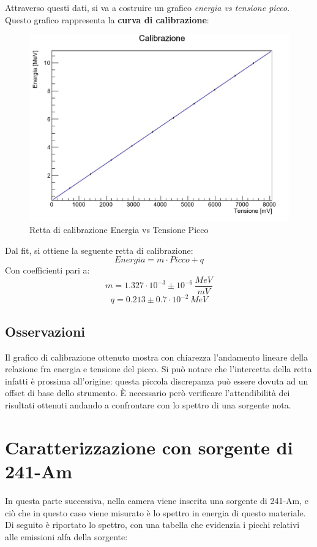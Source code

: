 \documentclass[a4paper,10pt]{article}
\begin{document}
\noindent Attraverso questi dati, si va a costruire un grafico \textit{energia vs tensione picco}. Questo grafico rappresenta la \textbf{curva di calibrazione}:

\begin{figure}[h!]
    \centering
    \includegraphics[scale=0.7]{rettacalibrazione.jpg}
    \caption{Retta di calibrazione Energia vs Tensione Picco}
\end{figure}

\noindent Dal fit, si ottiene la seguente retta di calibrazione:
$$
    Energia = m \cdot Picco + q
$$
Con coefficienti pari a:
$$
    m = 1.327\cdot10^{-3} \pm 10^{-6}\, \frac{MeV}{mV}
$$
$$
    q = 0.213 \pm 0.7\cdot10^{-2}\, MeV
$$


\subsection{Osservazioni}
Il grafico di calibrazione ottenuto mostra con chiarezza l'andamento lineare della relazione fra energia e tensione del picco. Si pu\`o notare che l'intercetta della retta infatti \`e prossima all'origine: questa piccola discrepanza pu\`o essere dovuta ad un offset di base dello strumento. 
\`E necessario per\`o verificare l'attendibilit\`a dei risultati ottenuti andando a confrontare con lo spettro di una sorgente nota.


\section{Caratterizzazione con sorgente di 241-Am}
In questa parte successiva, nella camera viene inserita una sorgente di 241-Am, e ci\`o che in questo caso viene misurato \`e lo spettro in energia di questo materiale. Di seguito \`e riportato lo spettro, con una tabella che evidenzia i picchi relativi alle emissioni alfa della sorgente:
\end{document}
